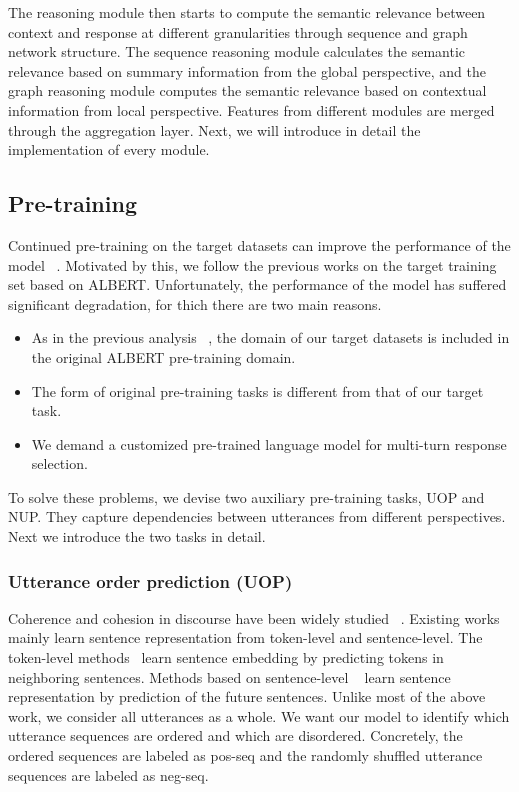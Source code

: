 \documentclass[letterpaper]{article}
\begin{document}
The reasoning module then starts to compute the semantic relevance between context and response at different granularities through sequence and graph network structure. The sequence reasoning module calculates the semantic relevance based on summary information from the global perspective, and the graph reasoning module computes the semantic relevance based on contextual information from local perspective. Features from different modules
are merged through the aggregation layer. Next, we will introduce in detail the implementation of every module.

\subsection{Pre-training}
Continued pre-training on the target datasets can improve the performance of the model ~\cite{Gururangan2020}. Motivated by this, we follow the previous works on the target training set based on ALBERT. Unfortunately, the performance of the model has suffered significant degradation, for thich there are two main reasons.

\begin{itemize}
    \item As in the previous analysis ~\cite{Gururangan2020}, the domain of our target datasets is included in the original ALBERT pre-training domain.
    \item The form of original pre-training tasks is different from that of our target task.
    \item We demand a customized pre-trained language model for multi-turn response selection.
\end{itemize}

To solve these problems, we devise two auxiliary pre-training tasks, UOP and NUP. They capture dependencies between utterances from different perspectives. Next we introduce the two tasks in detail.

\subsubsection{Utterance order prediction (UOP)} Coherence and cohesion in discourse have been widely studied ~\cite{grosz1995centering}. Existing works mainly learn sentence representation from token-level and sentence-level. The token-level methods~\cite{kiros2015skip,hill2016learning} learn sentence embedding by predicting tokens in neighboring sentences. Methods based on sentence-level ~\cite{gan2017learning,Lan2020} learn sentence representation by prediction of the future sentences. Unlike most of the above work, we consider all utterances as a whole. We want our model to identify which utterance sequences are ordered and which are disordered. Concretely, the ordered sequences are labeled as pos-seq and the randomly shuffled utterance sequences are labeled as neg-seq.
\end{document}
